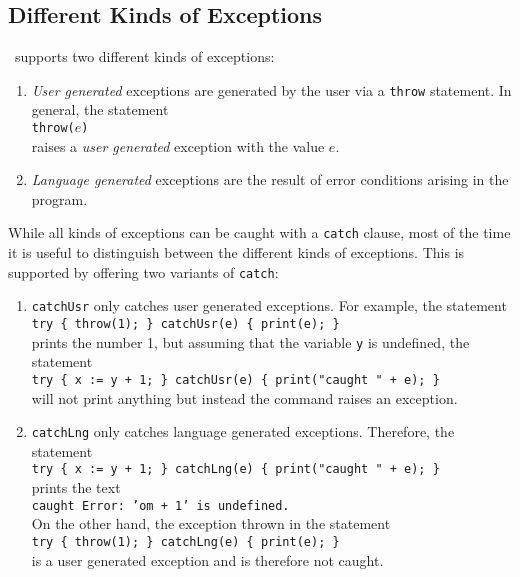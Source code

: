 \subsection{Different Kinds of Exceptions}
\setlx\ supports two different kinds of exceptions:
\begin{enumerate}
\item \emph{User generated} exceptions are generated by the user via a \texttt{throw} statement.
      In general, the statement
      \\[0.2cm]
      \hspace*{1.3cm}
      \texttt{throw($e$)}
      \\[0.2cm]
      raises a \emph{user generated} exception with the value $e$.
\item \emph{Language generated} exceptions are the result of error conditions arising in
      the program. 
\end{enumerate}
While all kinds of exceptions can be caught with a \texttt{catch} clause, most of the time
it is useful to distinguish between the different kinds of exceptions.  This is supported
by offering two variants of \texttt{catch}:
\begin{enumerate}
\item \texttt{catchUsr} only catches user generated exceptions.  For example, the statement
      \\[0.2cm]
      \hspace*{1.3cm}
      \texttt{try \{ throw(1); \} catchUsr(e) \{ print(e); \}}
      \\[0.2cm]
      prints the number 1, but assuming that the variable \texttt{y} is undefined, the 
      statement 
      \\[0.2cm]
      \hspace*{1.3cm}
      \texttt{try \{ x := y + 1; \} catchUsr(e) \{ print("caught " + e); \}}
      \\[0.2cm]
      will not print anything but instead the command raises an exception.
\item \texttt{catchLng} only catches language generated exceptions.  Therefore, the statement
      \\[0.2cm]
      \hspace*{1.3cm}
      \texttt{try \{ x := y + 1; \} catchLng(e) \{ print("caught " + e); \}}
      \\[0.2cm]
      prints the text
      \\[0.2cm]
      \hspace*{1.3cm}
      \texttt{caught Error: 'om + 1' is undefined.}
      \\[0.2cm]
      On the other hand,  the exception thrown in the statement
      \\[0.2cm]
      \hspace*{1.3cm}
      \texttt{try \{ throw(1); \} catchLng(e) \{ print(e); \}}
      \\[0.2cm]
      is a user generated exception and is therefore not caught.
\end{enumerate}
